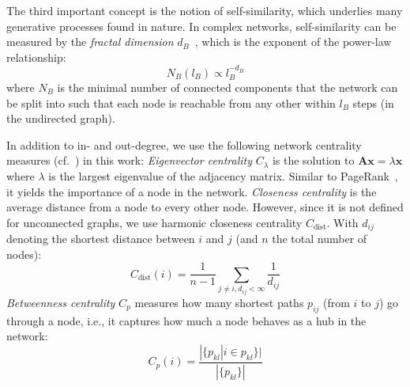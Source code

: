 The third important concept is the notion of self-similarity,
which underlies many generative processes found in nature.
In complex networks,
self-similarity can be measured by the \emph{fractal dimension} $d_B$~\cite{FractalComplex2005Song}, which is the exponent of the power-law relationship:
\begin{equation}
    N_B(l_B) \propto l_B^{-d_B}
\end{equation}
where $N_B$ is the minimal number of connected components that the network can be split into
such that each node is reachable from any other within $l_B$ steps (in the undirected graph).

In addition to in- and out-degree,
we use the following network centrality measures
(cf.~\cite{SnaMetrics2003Newman}) in this work:
\emph{Eigenvector centrality} $C_\lambda$ is the solution to
$\bm{A}\bm{x} = \lambda\bm{x}$
where $\lambda$ is the largest eigenvalue of the adjacency matrix.
Similar to PageRank~\cite{pagerank}, it yields the importance of a node in the network.
\emph{Closeness centrality} is the average distance from a node to every other node.
However, since it is not defined for unconnected graphs, we use harmonic closeness centrality $C_\text{dist}$.
With $d_{ij}$ denoting the shortest distance between $i$ and $j$ (and $n$ the total number of nodes):
\begin{equation}
    C_\text{dist}(i) = \frac{1}{n-1}\sum_{j\neq i,d_{ij}<\infty}{\frac{1}{d_{ij}}}
\end{equation}
\emph{Betweenness centrality} $C_p$ measures how many shortest paths $p_{ij}$ (from $i$ to $j$) go through a node, i.e., it captures how much a node behaves as a hub in the network:
\begin{equation}%
    C_p(i) = \frac{|\{p_{kl}|i\in p_{kl}\}|}{|\{p_{kl}\}|}
\end{equation}
